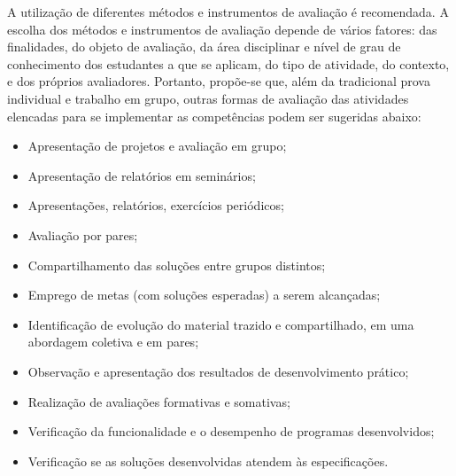 A utilização de diferentes métodos e instrumentos de avaliação é recomendada. A escolha dos métodos e instrumentos de avaliação depende de vários fatores: das finalidades, do objeto de avaliação, da área disciplinar e nível de grau de conhecimento dos estudantes a que se aplicam, do tipo de atividade, do contexto, e dos próprios avaliadores. Portanto, propõe-se que, além da tradicional prova individual e trabalho em grupo, outras formas de avaliação das atividades elencadas para se implementar as competências podem ser sugeridas abaixo:

\begin{itemize}
    \item Apresentação de projetos e avaliação em grupo;
    \item Apresentação de relatórios em seminários;
    \item Apresentações, relatórios, exercícios periódicos;
    \item Avaliação por pares;
    \item Compartilhamento das soluções entre grupos distintos;
    \item Emprego de metas (com soluções esperadas) a serem alcançadas;
    \item Identificação de evolução do material trazido e compartilhado, em uma abordagem coletiva e em pares;
    \item Observação e apresentação dos resultados de desenvolvimento prático;
    \item Realização de avaliações formativas e somativas;
    \item Verificação da funcionalidade e o desempenho de programas desenvolvidos;
    \item Verificação se as soluções desenvolvidas atendem às especificações.
\end{itemize}
                                           